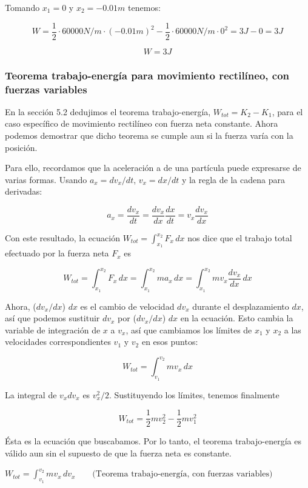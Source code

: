 \documentclass{article}
\newcommand{\newtitle}[1]{
    \color{titleColor}
    \subsubsection{\textbf{#1}}
    \color{black}
}
\newcommand{\definicion}[1]{%
    \vspace{0.5cm}
    \begin{definicionbox}
        #1
    \end{definicionbox}
    \vspace{0.5cm}
}
\begin{document}
    \par Tomando $x_1 = 0$ y $x_2 = -0.01 m$ tenemos:

    \[ W = \frac{1}{2} \cdot 60000 N/m \cdot (-0.01 m)^2 - \frac{1}{2} \cdot 60000 N/m \cdot 0^2 = 3 J - 0 = 3 J \]

    \[ W = 3 J \]

    \newtitle{Teorema trabajo-energía para movimiento rectilíneo, con fuerzas variables}

    \par En la sección 5.2 dedujimos el teorema trabajo-energía, $W_{tot} = K_2 - K_1$, para el caso específico de movimiento rectilíneo con fuerza neta constante. Ahora podemos demostrar que dicho teorema se cumple aun si la fuerza varía con la posición.
    \par Para ello, recordamos que la aceleración a de una partícula puede expresarse de varias formas. Usando $a_x = {dv_x}/{dt}$, $v_x = dx/dt$ y la regla de la cadena para derivadas:

    \[ a_x = \frac{dv_x}{dt} =  \frac{dv_x}{dx} \frac{dx}{dt} = v_x \frac{dv_x}{dx}  \]

    \par Con este resultado, la ecuación $W_{tot} = \int_{x_1}^{x_2} F_x \, dx$ nos dice que el trabajo total efectuado por la fuerza neta $F_x$ es

    \[ W_{tot} = \int_{x_1}^{x_2} F_x \, dx = \int_{x_1}^{x_2} m a_x \, dx = \int_{x_1}^{x_2} m v_x \frac{dv_x}{dx} \, dx \]

    \par Ahora, ($dv_x/dx$) $dx$ es el cambio de velocidad $dv_x$ durante el desplazamiento $dx$, así
que podemos sustituir $dv_x$ por ($dv_x/dx$) $dx$ en la ecuación. Esto cambia la variable de integración de $x$ a $v_x$, así que cambiamos los límites de $x_1$ y $x_2$ a las velocidades correspondientes $v_1$ y $v_2$ en esos puntos:

    \[ W_{tot} = \int_{v_1}^{v_2} m v_x \, dx \]

    \par La integral de $v_xdv_x$ es $v_x^2/2$. Sustituyendo los límites, tenemos finalmente

    \[ W_{tot} = \frac{1}{2} m v_2^2 - \frac{1}{2} m v_1^2 \]

    \par Ésta es la ecuación que buscabamos. Por lo tanto, el teorema trabajo-energía es válido aun sin el supuesto de que la fuerza neta es constante.

    \definicion{
        \centering
        \( W_{tot} = \int_{v_1}^{v_2} m v_x \, dv_x \quad \quad \text{(Teorema trabajo-energía, con fuerzas variables)} \)
    }
\end{document}

